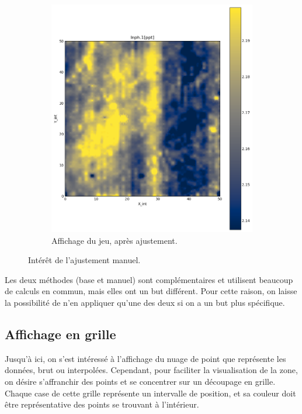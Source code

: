 \documentclass[12pt]{article}
\begin{document}
\begin{figure}[ht!]
\begin{subfigure}[b]{0.475\textwidth}
            \includegraphics[width=\textwidth]{Images/Base_man_grid_Apres_sq1.png}
            \caption[]%
            {{\small Affichage du jeu, après ajustement.}}
            \label{fig:2_evol_base_man_d}
        \end{subfigure}
        \caption{Intérêt de l'ajustement manuel.}
    \end{figure}
    
    Les deux méthodes (base et manuel) sont complémentaires et utilisent beaucoup de calculs en commun, mais elles ont un but différent. Pour cette raison, on laisse la possibilité de n'en appliquer qu'une des deux si on a un but plus spécifique.

\newpage
\subsection{Affichage en grille}\label{2-3}

    Jusqu'à ici, on s'est intéressé à l'affichage du nuage de point que représente les données, brut ou interpolées. Cependant, pour faciliter la visualisation de la zone, on désire s'affranchir des points et se concentrer sur un découpage en grille. Chaque case de cette grille représente un intervalle de position, et sa couleur doit être représentative des points se trouvant à l'intérieur.
\end{document}
